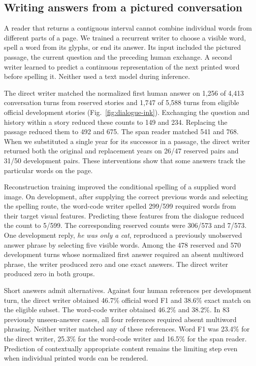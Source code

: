 \subsection*{Writing answers from a pictured conversation}
A reader that returns a contiguous interval cannot combine individual words from different parts of a page. We trained a recurrent writer to choose a visible word, spell a word from its glyphs, or end its answer. Its input included the pictured passage, the current question and the preceding human exchange. A second writer learned to predict a continuous representation of the next printed word before spelling it. Neither used a text model during inference.

The direct writer matched the normalized first human answer on 1,256 of 4,413 conversation turns from reserved stories and 1,747 of 5,588 turns from eligible official development stories (Fig.~\ref{fig:dialogue-ink}). Exchanging the question and history within a story reduced these counts to 149 and 234. Replacing the passage reduced them to 492 and 675. The span reader matched 541 and 768. When we substituted a single year for its successor in a passage, the direct writer returned both the original and replacement years on 26/47 reserved pairs and 31/50 development pairs. These interventions show that some answers track the particular words on the page.

Reconstruction training improved the conditional spelling of a supplied word image. On development, after supplying the correct previous words and selecting the spelling route, the word-code writer spelled 299/599 required words from their target visual features. Predicting these features from the dialogue reduced the count to 5/599. The corresponding reserved counts were 306/573 and 7/573. One development reply, \emph{he was only a cat}, reproduced a previously unobserved answer phrase by selecting five visible words. Among the 478 reserved and 570 development turns whose normalized first answer required an absent multiword phrase, the writer produced zero and one exact answers. The direct writer produced zero in both groups.

Short answers admit alternatives. Against four human references per development turn, the direct writer obtained 46.7\% official word F1 and 38.6\% exact match on the eligible subset. The word-code writer obtained 46.2\% and 38.2\%. In 83 previously unseen-answer cases, all four references required absent multiword phrasing. Neither writer matched any of these references. Word F1 was 23.4\% for the direct writer, 25.3\% for the word-code writer and 16.5\% for the span reader. Prediction of contextually appropriate content remains the limiting step even when individual printed words can be rendered.

